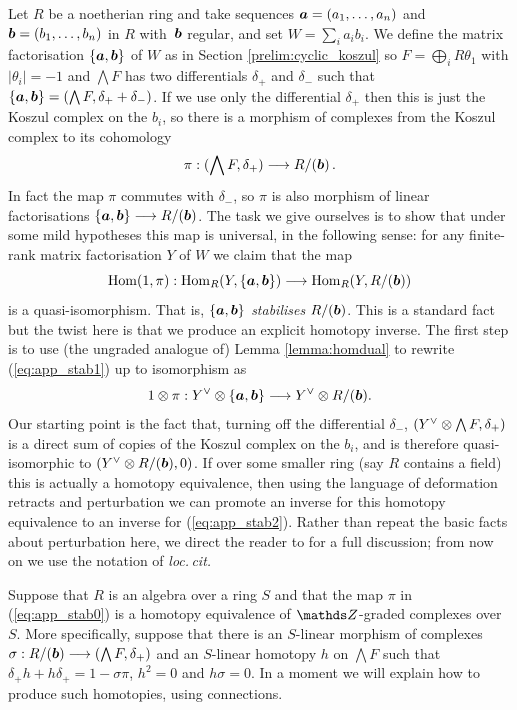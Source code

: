\documentclass{compositio}
\theoremstyle{definition}
\numberwithin{equation}{section}
\def\Hom{\operatorname{Hom}}
\begin{document}
Let $R$ be a noetherian ring and take sequences $\boldsymbol{a} = (a_1,\ldots,a_n)$ and $\boldsymbol{b} = (b_1, \ldots, b_n)$ in $R$ with~$\boldsymbol{b}$ regular, and set $W = \sum_i a_i b_i$. We define the matrix factorisation $\{ \boldsymbol{a}, \boldsymbol{b} \}$ of $W$ as in Section \ref{prelim:cyclic_koszul} so $F = \bigoplus_i R \theta_1$ with $|\theta_i| = -1$ and $\bigwedge F$ has two differentials $\delta_+$ and $\delta_{-}$ such that $\{ \boldsymbol{a}, \boldsymbol{b} \} = (\bigwedge F, \delta_+ + \delta_{-})$. If we use only the differential $\delta_+$ then this is just the Koszul complex on the $b_i$, so there is a morphism of complexes from the Koszul complex to its cohomology
\begin{equation}\label{eq:app_stab0}
\pi: ( \bigwedge F, \delta_+ ) \longrightarrow R/(\boldsymbol{b})\,.
\end{equation}
In fact the map $\pi$ commutes with $\delta_{-}$, so $\pi$ is also morphism of linear factorisations $\{ \boldsymbol{a}, \boldsymbol{b} \} \longrightarrow R/(\boldsymbol{b})$. The task we give ourselves is to show that under some mild hypotheses this map is universal, in the following sense: for any finite-rank matrix factorisation $Y$ of $W$ we claim that the map
\begin{equation}\label{eq:app_stab1}
\Hom(1, \pi): \Hom_R(Y, \{ \ba, \bb \}) \lto \Hom_R(Y, R/(\bb))
\end{equation}
is a quasi-isomorphism. That is, $\{ \boldsymbol{a}, \boldsymbol{b} \}$ \emph{stabilises} $R/(\boldsymbol{b})$. This is a standard fact \cite{tobythesis,eisenbud} but the twist here is that we produce an explicit homotopy inverse. The first step is to use (the ungraded analogue of) Lemma \ref{lemma:homdual} to rewrite (\ref{eq:app_stab1}) up to isomorphism as
\begin{equation}\label{eq:app_stab2}
1 \otimes \pi: Y^{\vee} \otimes \{ \boldsymbol{a}, \boldsymbol{b} \} \longrightarrow Y ^{\vee} \otimes R/(\boldsymbol{b}).
\end{equation}
Our starting point is the fact that, turning off the differential $\delta_-$, $(Y^{\vee} \otimes \bigwedge F, \delta_+)$ is a direct sum of copies of the Koszul complex on the $b_i$, and is therefore quasi-isomorphic to $(Y^{\vee} \otimes R/(\boldsymbol{b}), 0)$. If over some smaller ring (say $R$ contains a field) this is actually a homotopy equivalence, then using the language of deformation retracts and perturbation we can promote an inverse for this homotopy equivalence to an inverse for (\ref{eq:app_stab2}). Rather than repeat the basic facts about perturbation here, we direct the reader to \cite[Section 5]{dm1102.2957} for a full discussion; from now on we use the notation of \emph{loc.\,cit.}

Suppose that $R$ is an algebra over a ring $S$ and that the map $\pi$ in (\ref{eq:app_stab0}) is a homotopy equivalence of $\ZZ$-graded complexes over $S$. More specifically, suppose that there is an $S$-linear morphism of complexes $\sigma: R/(\boldsymbol{b}) \longrightarrow (\bigwedge F, \delta_+)$ and an $S$-linear homotopy $h$ on $\bigwedge F$ such that $\delta_+ h + h \delta_+ = 1 - \sigma \pi$, $h^2 = 0$ and $h \sigma = 0$. In a moment we will explain how to produce such homotopies, using connections.
\end{document}
